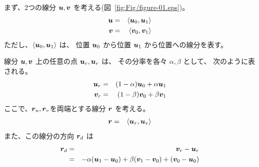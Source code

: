 \documentclass[11pt,a4j]{jarticle}
\def\figref#1{図~\ref{#1}}
\begin{document}
まず、2つの線分 ${\bm{u}},{\bm{v}}$ を考える(\figref{fig:Fig/figure-01.eps})。
  \begin{eqnarray}
    {\bm{u}} & = & \left< {\bm{u}}_0, {\bm{u}}_1 \right>
  \\
    {\bm{v}} & = & \left< {\bm{v}}_0, {\bm{v}}_1 \right>
  \end{eqnarray}
ただし、$ \left< {\bm{u}}_0, {\bm{u}}_1 \right> $ は、
位置 ${\bm{u}}_0$ から位置 ${\bm{u}}_1$ から位置への線分を表す。

線分 ${\bm{u}},{\bm{v}}$ 上の任意の点 ${\bm{u}}_r,{\bm{u}}_r$ は、
その分率を各々 $\alpha,\beta$ として、
次のように表される。
  \begin{eqnarray}
    {\bm{u}}_r & = & (1-\alpha) {\bm{u}}_0 + \alpha {\bm{u}}_1
  \\
    {\bm{v}}_r & = & (1-\beta)  {\bm{v}}_0 + \beta  {\bm{v}}_1
  \end{eqnarray}
ここで、${\bm{r}}_u,{\bm{r}}_v$を両端とする線分 ${\bm{r}}$ を考える。
  \begin{eqnarray}
    {\bm{r}} & = & \left< {\bm{u}}_r,{\bm{u}}_v \right>
  \end{eqnarray}
また、この線分の方向 ${\bm{r}}_d$ は
  \begin{eqnarray}
    {\bm{r}}_d
      & = & {\bm{v}}_r - {\bm{u}}_r
  \\
      & = &
        - \alpha ({\bm{u}}_1 - {\bm{u}}_0)
        + \beta  ({\bm{v}}_1 - {\bm{v}}_0)
        + ({\bm{v}}_0 - {\bm{u}}_0)
  \end{eqnarray}
\end{document}
